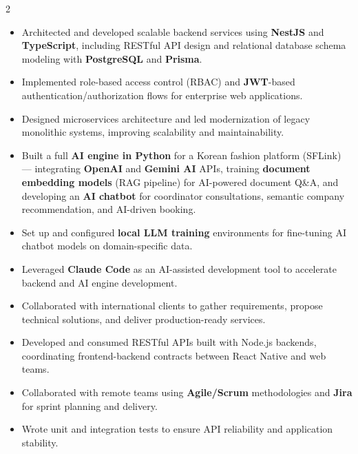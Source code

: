 \documentclass[10pt,a4paper,ragged2e,withhyper]{altacv}
\begin{document}
\begin{paracol}{2}


\begin{itemize}
\item Architected and developed scalable backend services using \textbf{NestJS} and \textbf{TypeScript}, including RESTful API design and relational database schema modeling with \textbf{PostgreSQL} and \textbf{Prisma}.
\item Implemented role-based access control (RBAC) and \textbf{JWT}-based authentication/authorization flows for enterprise web applications.
\item Designed microservices architecture and led modernization of legacy monolithic systems, improving scalability and maintainability.
\item Built a full \textbf{AI engine in Python} for a Korean fashion platform (SFLink) — integrating \textbf{OpenAI} and \textbf{Gemini AI} APIs, training \textbf{document embedding models} (RAG pipeline) for AI-powered document Q\&A, and developing an \textbf{AI chatbot} for coordinator consultations, semantic company recommendation, and AI-driven booking.
\item Set up and configured \textbf{local LLM training} environments for fine-tuning AI chatbot models on domain-specific data.
\item Leveraged \textbf{Claude Code} as an AI-assisted development tool to accelerate backend and AI engine development.
\item Collaborated with international clients to gather requirements, propose technical solutions, and deliver production-ready services.
\end{itemize}

\begin{itemize}
    \item Developed and consumed RESTful APIs built with Node.js backends, coordinating frontend-backend contracts between React Native and web teams.
    \item Collaborated with remote teams using \textbf{Agile/Scrum} methodologies and \textbf{Jira} for sprint planning and delivery.
    \item Wrote unit and integration tests to ensure API reliability and application stability.
\divider
\end{itemize}


\end{paracol}
\end{document}
